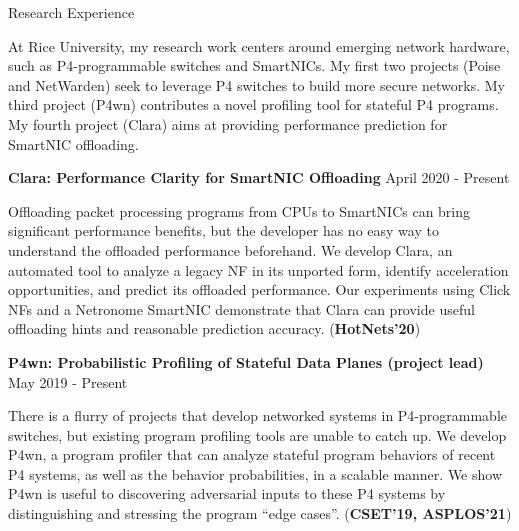 \documentclass{resume} %
\begin{document}
\begin{rSection}{Research Experience}

\vspace{2mm}

At Rice University, my research work centers around emerging network hardware,
such as P4-programmable switches and SmartNICs.
My first two projects (Poise and NetWarden) seek to leverage P4 switches to build more secure networks.
My third project (P4wn) contributes a novel profiling tool for stateful P4 programs.
My fourth project (Clara) aims at providing performance prediction for SmartNIC offloading.

\vspace{2mm}

\item {\bf Clara: Performance Clarity for SmartNIC Offloading} \hfill { April 2020 - Present}

Offloading packet processing programs from CPUs to SmartNICs can bring significant performance benefits,
but the developer has no easy way to understand the offloaded performance beforehand.
We develop Clara, an automated tool to analyze a legacy NF in its unported form,
identify acceleration opportunities, and predict its offloaded performance.
Our experiments using Click NFs and a Netronome SmartNIC demonstrate that Clara
can provide useful offloading hints and reasonable prediction accuracy.
({\bf HotNets'20})

\vspace{3mm}

\item {\bf P4wn: Probabilistic Profiling of Stateful Data Planes (project lead)}    \hfill { May 2019 - Present}

There is a flurry of projects that develop networked systems in P4-programmable switches,
but existing program profiling tools are unable to catch up.
We develop P4wn, a program profiler that can analyze stateful program behaviors
of recent P4 systems, as well as the behavior probabilities, in a scalable manner.
We show P4wn is useful to discovering adversarial inputs to these P4 systems
by distinguishing and stressing the program ``edge cases''.
({\bf CSET'19, ASPLOS'21})

\vspace{3mm}


\end{rSection}
\end{document}
